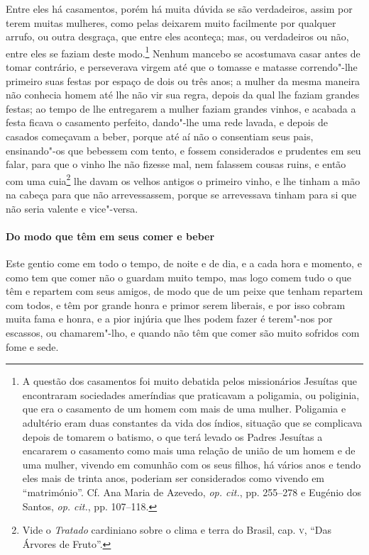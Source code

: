 Entre eles há casamentos, porém há muita dúvida se são
verdadeiros, assim por terem muitas mulheres, como pelas deixarem muito
facilmente por qualquer arrufo, ou outra desgraça, que entre eles
aconteça; mas, ou verdadeiros ou não, entre eles se faziam deste 
modo.\footnote{ A questão dos casamentos foi muito debatida pelos
missionários Jesuítas que encontraram sociedades ameríndias que
praticavam a poligamia, ou poliginia, que era o casamento de um homem
com mais de uma mulher. Poligamia e adultério eram duas constantes da
vida dos índios, situação que se complicava depois de tomarem o
batismo, o que terá levado os Padres Jesuítas a encararem o casamento
como mais uma relação de união de um homem e de uma mulher, vivendo em
comunhão com os seus filhos, há vários anos e tendo eles mais de trinta
anos, poderiam ser considerados como vivendo em ``matrimónio''. Cf. Ana
Maria de Azevedo, \textit{op. cit.}, pp. 255--278 e Eugénio dos Santos,
\textit{op. cit.}, pp. 107--118.} Nenhum mancebo se acostumava casar
antes de tomar contrário, e perseverava virgem até que o tomasse e
matasse correndo"-lhe primeiro suas festas por espaço de dois ou três
anos; a mulher da mesma maneira não conhecia homem até lhe não vir sua
regra, depois da qual lhe faziam grandes festas; ao tempo de lhe
entregarem a mulher faziam grandes vinhos, e acabada a festa ficava o
casamento perfeito, dando"-lhe uma rede lavada, e depois de casados
começavam a beber, porque até aí não o consentiam seus pais,
ensinando"-os que bebessem com tento, e fossem considerados e prudentes
em seu falar, para que o vinho lhe não fizesse mal, nem falassem
cousas ruins, e então com uma cuia\footnote{ Vide o \textit{Tratado}
cardiniano sobre o clima e terra do Brasil, cap. \textsc{v}, ``Das Árvores de
Fruto''.} lhe davam os velhos antigos o primeiro vinho, e lhe tinham a
mão na cabeça para que não arrevessassem, porque se arrevessava tinham
para si que não seria valente e vice"-versa. 

\paragraph{Do modo que têm em seus comer e beber}

Este gentio come em todo o tempo, de noite e de dia, e a cada
hora e momento, e como tem que comer não o guardam muito tempo, mas
logo comem tudo o que têm e repartem com seus amigos, de modo que de um
peixe que tenham repartem com todos, e têm por grande honra e primor
serem liberais, e por isso cobram muita fama e honra, e a pior injúria
que lhes podem fazer é terem"-nos por escassos, ou chamarem"-lho, e
quando não têm que comer são muito sofridos com fome e sede.


